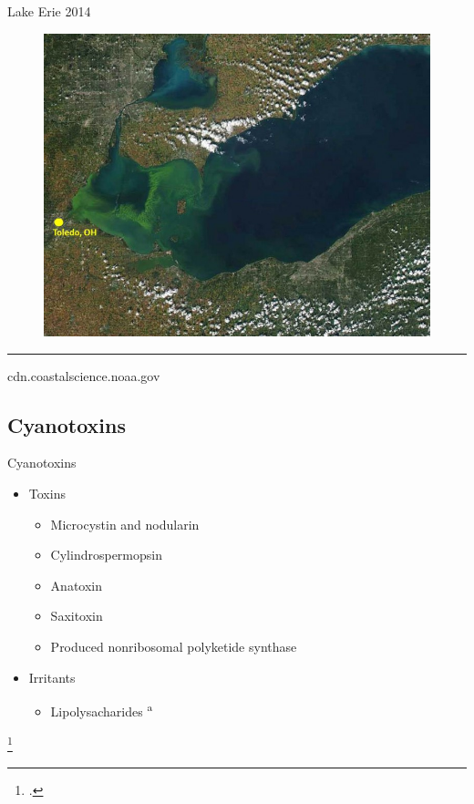 \begin{frame}{Lake Erie 2014}
	\begin{figure}
		\centering
		\includegraphics[scale=0.35]{erie.jpg}
	\end{figure}
\hrule
{\tiny cdn.coastalscience.noaa.gov}
\end{frame}
\subsection{Cyanotoxins}
\begin{frame}{Cyanotoxins}

	\begin{itemize}
		\item Toxins
			\begin{itemize} 
				\item Microcystin and nodularin %
  				\item Cylindrospermopsin 
				\item Anatoxin 
				\item Saxitoxin 
				\item Produced nonribosomal polyketide synthase
			\end{itemize}
		\item Irritants
			\begin{itemize}
				\item Lipolysacharides \textsuperscript{a}
			\end{itemize}

	\end{itemize}
	\footcitetext{[a], moore_richard_cyanobacterial_1993}
\end{frame}

